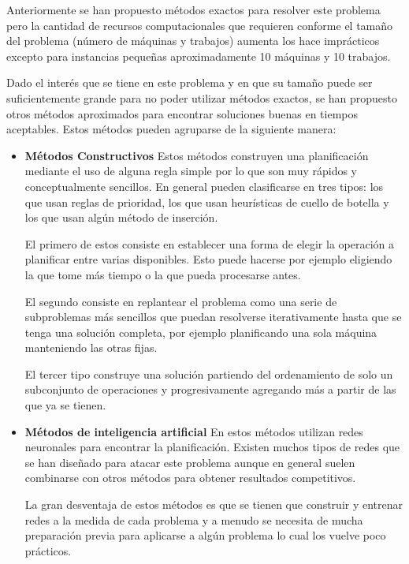 Anteriormente se han propuesto métodos exactos para resolver este problema \cite{Brucker1994} pero la cantidad de recursos computacionales que requieren conforme el tamaño del problema (número de máquinas y trabajos) aumenta los hace imprácticos excepto para instancias pequeñas aproximadamente 10 máquinas y 10 trabajos.


Dado el interés que se tiene en este problema y en que su tamaño puede ser suficientemente grande para no poder utilizar métodos exactos, se han propuesto otros métodos aproximados para encontrar soluciones buenas en tiempos aceptables. Estos métodos pueden agruparse de la siguiente manera\cite{jain1998state,Zhang2019}:
\begin{itemize}
\item \textbf{Métodos Constructivos} Estos métodos construyen una planificación mediante el uso de alguna regla simple por lo que son muy rápidos y conceptualmente sencillos. En general pueden clasificarse en tres tipos: los que usan reglas de prioridad, los que usan heurísticas de cuello de botella y los que usan algún método de inserción.

    El primero de estos consiste en establecer una forma de elegir la operación a planificar entre varias disponibles. Esto puede hacerse por ejemplo eligiendo la que tome más tiempo o la que pueda procesarse antes.

        El segundo consiste en replantear el problema como una serie de subproblemas más sencillos que puedan resolverse iterativamente hasta que se tenga una solución completa, por ejemplo planificando una sola máquina manteniendo las otras fijas.

        El tercer tipo construye una solución partiendo del ordenamiento de solo un subconjunto de operaciones y progresivamente agregando más a partir de las que ya se tienen.

\item \textbf{Métodos de inteligencia artificial} En estos métodos utilizan redes neuronales para encontrar la planificación. Existen muchos tipos de redes que se han diseñado para atacar este problema aunque en general suelen combinarse con otros métodos para obtener resultados competitivos.

    La gran desventaja de estos métodos es que se tienen que construir y entrenar redes a la medida de cada problema y a menudo se necesita de mucha preparación previa para aplicarse a algún problema lo cual los vuelve poco prácticos.


\end{itemize}
